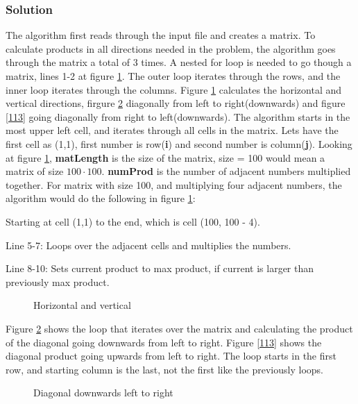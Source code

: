 \documentclass[a4paper, 11pt, titlepage]{article}
\begin{document}
\subsubsection{Solution}
The algorithm first reads through the input file and creates a matrix. To calculate products in all directions needed in the problem, the algorithm goes through the matrix a total of 3 times. A nested for loop is needed to go though a matrix, lines 1-2 at figure \ref{111}. The outer loop iterates through the rows, and the inner loop iterates through the columns. Figure \ref{111} calculates the horizontal and vertical directions, firgure \ref{112} diagonally from left to right(downwards) and figure \ref{113} going diagonally from right to left(downwards). The algorithm starts in the most upper left cell, and iterates through all cells in the matrix. Lets have the first cell as (1,1), first number is row(\textbf{i}) and second number is column(\textbf{j}). Looking at figure \ref{111}, \textbf{matLength} is the size of the matrix, size = 100 would mean a matrix of size $100 \cdot 100$. \textbf{numProd} is the number of adjacent numbers multiplied together. For matrix with size 100, and multiplying four adjacent numbers, the algorithm would do the following in figure \ref{111}: 
\begin{list}{}{}
	\item Starting at cell (1,1) to the end, which is cell (100, 100 - 4).
	\item Line 5-7: Loops over the adjacent cells and multiplies the numbers.
	\item Line 8-10: Sets current product to max product, if current is larger than previously max product.
\end{list}
\begin{figure}[H]
	\begin{center}
		
		\caption{Horizontal and vertical}
		\label{111}
	\end{center}
\end{figure}
Figure \ref{112} shows the loop that iterates over the matrix and calculating the product of the diagonal going downwards from left to right. Figure \ref{113} shows the diagonal product going upwards from left to right. The loop starts in the first row, and starting column is the last, not the first like the previously loops.
\begin{figure}[H]
	\begin{center}
		
		\caption{Diagonal downwards left to right}
		\label{112}
	\end{center}
\end{figure}
\end{document}
